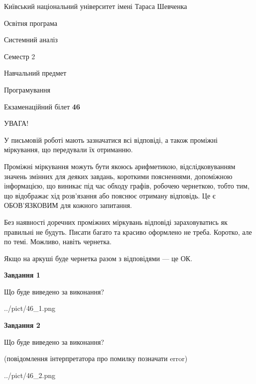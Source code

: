 \documentclass[12pt, ukrainian]{article}
\begin{document}
{{\begin {small}\par
{ \center  Київський національний університет імені Тараса Шевченка \par}
{\parbox {5 cm}{Освітня програма \hfill}{\parbox {7 cm}{Системний аналіз \hfill}}\parbox {6 cm}{\hfill Семестр 2}}\par
{\parbox {5 cm} {Навчальний предмет \hfill}\parbox {7 cm}{Програмування \hfill}\parbox {6cm}{\hfill}\par}\vspace{-7pt} \end{small}}{\center Екзаменаційний білет \No \textbf
{ 46 }\par}}
{
\begin {large}
УВАГА!

У письмовій роботі мають зазначатися всі відповіді, а також проміжні міркування, що передували їх отриманню.

Проміжні міркування можуть бути якоюсь арифметикою, відслідковуванням зна\-чень змінних для деяких завдань,
короткими поясненнями, допоміжною інформацією, що виникає під час обходу графів, робочею чернеткою,
тобто тим, що відображає хід розв’язання або пояснює отриману відповідь.
Це є ОБОВ’ЯЗКОВИМ для кожного запитання.

Без наявності доречних проміжних міркувань відповіді зараховуватись як правиль\-ні не будуть.
Писати багато та красиво оформлено не треба. Коротко, але по темі. Можли\-во, навіть чернетка.

Якщо на аркуші буде чернетка разом з відповідями --- це ОК.

\newpage

{\begin {center}\textbf{Завдання 1}\end {center}}\par
Що буде виведено за виконання?\par
\begin{center}
	{../pict/46_1.png}
\end{center}
\newpage

{\begin {center}\textbf{Завдання 2}\end {center}}\par
Що буде виведено за виконання?\par
 (повідомлення інтерпретатора про помилку позначати error)\par
\begin{center}
	{../pict/46_2.png}
\end{center}
\newpage


\end{large}}
\end{document}
